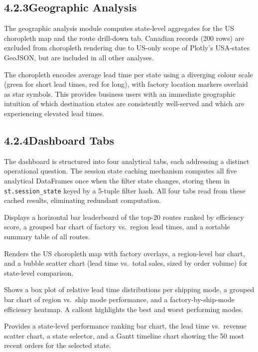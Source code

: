 \documentclass[12pt, a4paper]{report}
\begin{document}
\subsection*{4.2.3\quad Geographic Analysis}

The geographic analysis module computes state-level aggregates for the
US choropleth map and the route drill-down tab. Canadian records (200 rows)
are excluded from choropleth rendering due to US-only scope of Plotly's
USA-states GeoJSON, but are included in all other analyses.

The choropleth encodes average lead time per state using a diverging
colour scale (green for short lead times, red for long), with factory
location markers overlaid as star symbols. This provides business users
with an immediate geographic intuition of which destination states are
consistently well-served and which are experiencing elevated lead times.

\subsection*{4.2.4\quad Dashboard Tabs}

The dashboard is structured into four analytical tabs, each addressing a
distinct operational question. The session state caching mechanism computes
all five analytical DataFrames once when the filter state changes, storing
them in \texttt{st.session\_state} keyed by a 5-tuple filter hash. All four
tabs read from these cached results, eliminating redundant computation.

\begin{description}[leftmargin=0pt, itemsep=8pt]
  \item[\textbf{Tab 1 — Route Efficiency Overview:}]
    Displays a horizontal bar leaderboard of the top-20 routes ranked by
    efficiency score, a grouped bar chart of factory vs.\ region lead times,
    and a sortable summary table of all routes.

  \item[\textbf{Tab 2 — Geographic Shipping Map:}]
    Renders the US choropleth map with factory overlays, a region-level
    bar chart, and a bubble scatter chart (lead time vs.\ total sales,
    sized by order volume) for state-level comparison.

  \item[\textbf{Tab 3 — Ship Mode Comparison:}]
    Shows a box plot of relative lead time distributions per shipping mode,
    a grouped bar chart of region vs.\ ship mode performance, and a
    factory-by-ship-mode efficiency heatmap. A callout highlights the best
    and worst performing modes.

  \item[\textbf{Tab 4 — Route Drill-Down:}]
    Provides a state-level performance ranking bar chart, the lead time
    vs.\ revenue scatter chart, a state selector, and a Gantt timeline
    chart showing the 50 most recent orders for the selected state.
\end{description}
\end{document}
